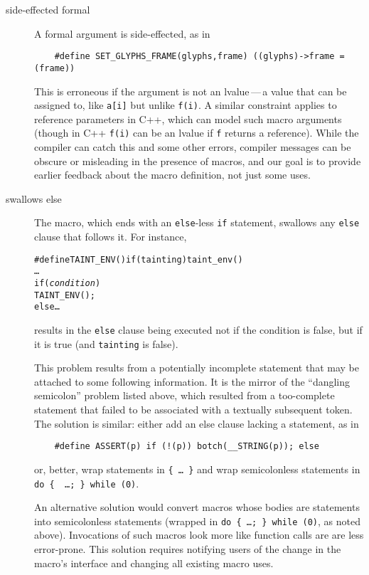 \documentclass[10pt]{article}
\begin{document}
\begin{description}
\item[side-effected formal]
        A formal argument is side-effected, as in
\begin{verbatim}
    #define SET_GLYPHS_FRAME(glyphs,frame) ((glyphs)->frame = (frame))
\end{verbatim}
        This is erroneous if the
        argument is not an lvalue\,---\,a value that can be assigned to, like
        {\tt a[i]} but unlike {\tt f(i)}.  A similar constraint applies to
        reference parameters in C++, which can model such macro arguments
        (though in C++ {\tt f(i)} can be an lvalue if {\tt f} returns a reference).
        While the compiler can catch this and some other errors, compiler
        messages can be obscure or misleading in the presence of macros,
        and our goal is to provide earlier feedback about the macro
        definition, not just some uses.

\item[swallows else]
        The macro, which ends with an {\tt else}-less {\tt if} statement,
        swallows any {\tt else} clause that follows it.  For instance,
\begin{alltt}
    #define TAINT_ENV() if (tainting) taint_env()
    \ldots
    if ({\rm\em{}condition})
      TAINT_ENV();
    else \ldots
\end{alltt}
        results in the {\tt else} clause being executed not if  the
        condition is false, but if it is true (and {\tt tainting} is false).
        
        This problem results from a potentially incomplete statement that
        may be attached to some following information.  It is the mirror of
        the ``dangling semicolon'' problem listed above, which
        resulted from a too-complete statement that failed to be
        associated with a textually subsequent token.  The solution is
        similar: either add an else clause lacking a statement, as in
\begin{verbatim}
    #define ASSERT(p) if (!(p)) botch(__STRING(p)); else
\end{verbatim}
        or, better, wrap statements in {\tt \verb|{| \ldots\ \verb|}|} and
        wrap semicolonless statements in {\tt do \verb|{| {\rm
        \ldots}\verb|; }| while (0)}.
      
        An alternative solution would convert macros whose bodies are
        statements into semicolonless statements (wrapped in {\tt do \verb|{|
        {\rm \ldots}\verb|; }| while (0)}, as noted above).  Invocations of
        such macros look more like function calls are are less error-prone.
        This solution requires notifying users of the change in the macro's
        interface and changing all existing macro uses.
        

\end{description}
\end{document}
